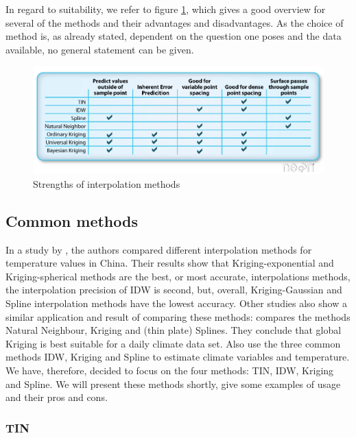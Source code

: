 In regard to suitability, we refer to figure \ref{fig:interpolation_methods_strengths}, which gives a good overview for several of the methods and their advantages and disadvantages. As the choice of method is, as already stated, dependent on the question one poses and the data available, no general statement can be given.


\begin{figure}[b!]
	\includegraphics[width=\linewidth]{images/interpolation_methods_strengths.png}
	\caption{Strengths of interpolation methods \cite{wasser_going_2020}}
	\label{fig:interpolation_methods_strengths}
\end{figure}

\subsection{Common methods}

In a study by \citeauthor{wenjing_cao_study_2009}, the authors compared different interpolation methods for temperature values in China. Their results show that Kriging-exponential and Kriging-spherical methods are the best, or most accurate, interpolations methods, the interpolation precision of IDW is second, but, overall, Kriging-Gaussian and Spline interpolation methods have the lowest accuracy. \cite{wenjing_cao_study_2009} Other studies also show a similar application and result of comparing these methods: 
\citeauthor{hofstra_comparison_2008} compares the methods Natural Neighbour, Kriging and (thin plate) Splines. They conclude that global Kriging is best suitable for a daily climate data set. Also \citeauthor{samanta_interpolation_2012} use the three common methods IDW, Kriging and Spline to estimate climate variables and temperature.
We have, therefore, decided to focus on the four methods: TIN, IDW, Kriging and Spline. We will present these methods shortly, give some examples of usage and their pros and cons.

\subsubsection{TIN}

